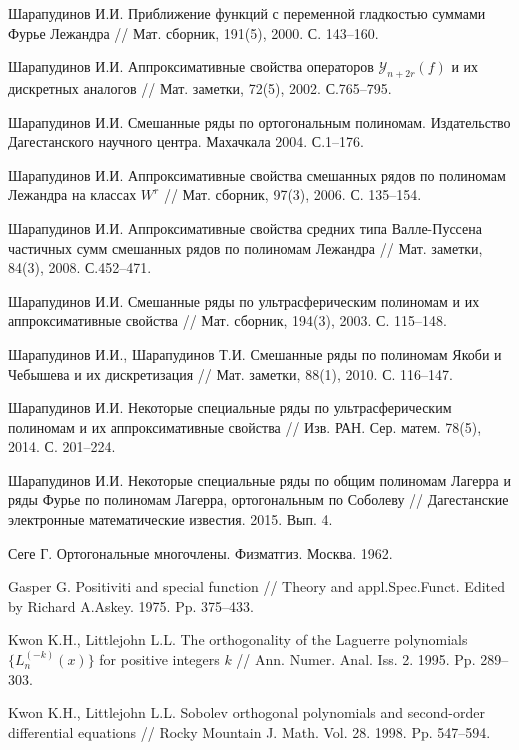 \begin{thebibliography}{111}
{Шарапудинов И.И.} Приближение функций с переменной гладкостью суммами Фурье Лежандра // Мат. сборник,
191(5), 2000. С. 143--160.


{Шарапудинов И.И.} Аппроксимативные свойства операторов $\mathcal{ Y}_{n+2r}(f)$ и их дискретных аналогов // Мат. заметки, 72(5), 2002. С.765--795.


{Шарапудинов И.И.} Смешанные ряды по ортогональным полиномам. Издательство Дагестанского научного центра.
Махачкала 2004. С.1--176.


{Шарапудинов И.И.}
Аппроксимативные свойства смешанных рядов по полиномам Лежандра на классах $W^r$ //
Мат. сборник, 97(3), 2006. С. 135--154.


{Шарапудинов И.И.}
Аппроксимативные свойства средних типа Валле-Пуссена частичных сумм смешанных рядов по полиномам Лежандра // Мат. заметки, 84(3), 2008. С.452--471.


{Шарапудинов И.И.}
 Смешанные ряды по ультрасферическим полиномам и их аппроксимативные свойства
// Мат. сборник, 194(3), 2003. С. 115--148.


{Шарапудинов И.И., Шарапудинов Т.И.}
 Смешанные ряды по полиномам Якоби и Чебышева и их дискретизация
// Мат. заметки, 88(1), 2010. С. 116--147.


{Шарапудинов И.И.}
 Некоторые специальные ряды по ультрасферическим полиномам и их аппроксимативные свойства
// Изв. РАН. Сер. матем. 78(5), 2014. С. 201--224.


{Шарапудинов И.И.}
 Некоторые специальные ряды по общим полиномам Лагерра и ряды Фурье по полиномам Лагерра, ортогональным по Соболеву
// Дагестанские электронные математические известия. 2015. Вып. 4.


{Сеге Г.} Ортогональные многочлены. Физматгиз. Москва. 1962.


{Gasper G.}
 Positiviti and special function
// Theory and appl.Spec.Funct. Edited by Richard A.Askey. 1975. Pp. 375--433.


{Kwon K.H., Littlejohn L.L.}
 The orthogonality of the Laguerre polynomials $\{L_n^{(-k)}(x)\}$ for positive integers $k$
// Ann. Numer. Anal. Iss. 2. 1995. Pp. 289--303.


{Kwon K.H., Littlejohn L.L.}
 Sobolev orthogonal polynomials and second-order differential equations
// Rocky Mountain J. Math. Vol. 28. 1998. Pp. 547--594.



\end{thebibliography}
